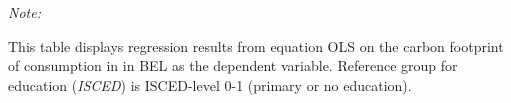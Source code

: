 \begin{table}[htbp!]
\begin{adjustbox}{width = 1\textwidth, max height = 0.95\textheight, center}
\begin{threeparttable}[b]
         \begin{tablenotes}\item \medskip \textit{Note:}
            \item This table displays regression results from equation OLS on the carbon footprint of consumption in  in BEL as the dependent variable.  Reference group for education (\textit{ISCED}) is ISCED-level 0-1 (primary or no education).
         \end{tablenotes}
      \end{threeparttable}
   \end{adjustbox}
\end{table}


